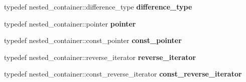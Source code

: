 \begin{DoxyCompactItemize}
typedef nested\+\_\+container\+::difference\+\_\+type {\bfseries difference\+\_\+type}
\item 
\mbox{\label{classnasty__list_a7e8866c6cba4a738105d74f1e713ea5d}} 
typedef nested\+\_\+container\+::pointer {\bfseries pointer}
\item 
\mbox{\label{classnasty__list_a8a11bf991bee1886bee9711deaa504eb}} 
typedef nested\+\_\+container\+::const\+\_\+pointer {\bfseries const\+\_\+pointer}
\item 
\mbox{\label{classnasty__list_ab3850ae710cd3fa2bcfa990f6c86bd76}} 
typedef nested\+\_\+container\+::reverse\+\_\+iterator {\bfseries reverse\+\_\+iterator}
\item 
\mbox{\label{classnasty__list_a2a806d930e71628bfb0e8ed7ae0aa4f0}} 
typedef nested\+\_\+container\+::const\+\_\+reverse\+\_\+iterator {\bfseries const\+\_\+reverse\+\_\+iterator}
\end{DoxyCompactItemize}

